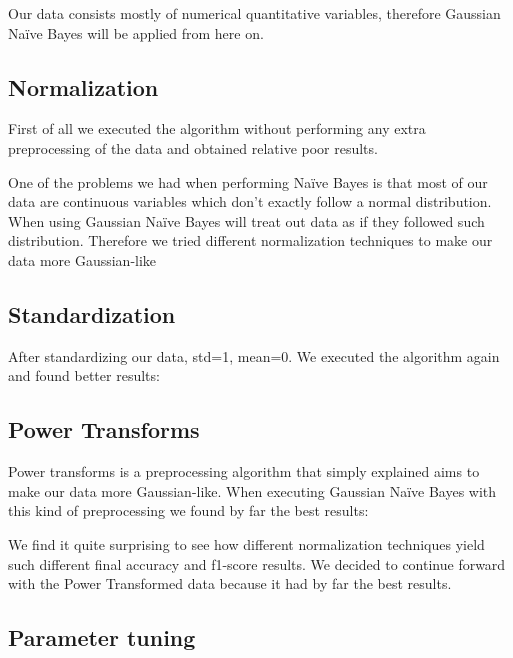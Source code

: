Our data consists mostly of numerical quantitative variables, therefore Gaussian Na\"ive Bayes will be applied from here on.

\subsection{Normalization}

First of all we executed the algorithm without performing any extra preprocessing of the data and obtained
relative poor results.


One of the problems we had when performing Na\"ive Bayes is that most of our data are continuous variables
which don't exactly follow a normal distribution. When using Gaussian Na\"ive Bayes will treat out data 
as if they followed such distribution. Therefore we tried different normalization techniques to make our
data more Gaussian-like

\subsection{Standardization}

After standardizing our data, std=1, mean=0. We executed the algorithm again and found better results:


\subsection{Power Transforms}

Power transforms is a preprocessing algorithm that simply explained aims to make our data more Gaussian-like. When executing Gaussian Na\"ive Bayes with this kind of preprocessing we found by far the best results:


We find it quite surprising to see how different normalization techniques yield such 
different final accuracy and f1-score results. We decided to continue forward with the Power 
Transformed data because it had by far the best results.

\subsection{Parameter tuning}

